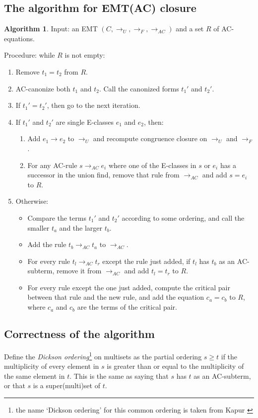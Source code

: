 \documentclass[12pt,a4paper,twoside,openright]{report}
\numberwithin{equation}{chapter}		%
\numberwithin{figure}{chapter}			%
\numberwithin{table}{chapter}			%
\theoremstyle{definition}
\newtheorem{algorithm}{Algorithm}
\theoremstyle{plain}
\begin{document}
\subsection{The algorithm for EMT(AC) closure}
\begin{algorithm} \label{acclosure}
	Input: an EMT $(C, \rightarrow_U, \rightarrow_F, \rightarrow_{AC})$ and a set $R$ of AC-equations.
	
	Procedure: while $R$ is not empty:
		\begin{enumerate}
			\item Remove $t_1 = t_2$ from $R$.
			\item AC-canonize both $t_1$ and $t_2$. Call the canonized forms $t_1'$ and $t_2'$.
			\item If $t_1' = t_2'$, then go to the next iteration.
			\item If $t_1'$ and $t_2'$ are single E-classes $e_1$ and $e_2$, then:
					\begin{enumerate}
						\item Add $e_1 \rightarrow e_2$ to $\rightarrow_U$ and recompute congruence closure on $\rightarrow_U$ and $\rightarrow_F$.
						\item For any AC-rule $s \rightarrow_{AC} e_i$ where one of the E-classes in $s$ or $e_i$ has a successor in the union find, remove that rule from $\rightarrow_{AC}$ and add $s = e_i$ to $R$.
					\end{enumerate}
			\item Otherwise:
				\begin{itemize}
					\item Compare the terms $t_1'$ and $t_2'$ according to some ordering, and call the smaller $t_a$ and the larger $t_b$.
					\item Add the rule $t_b \rightarrow_{AC} t_a$ to $\rightarrow_{AC}$.
					\item For every rule $t_l \rightarrow_{AC} t_r$ except the rule just added, if $t_l$ has $t_b$ as an AC-subterm, remove it from $\rightarrow_{AC}$ and add $t_l = t_r$ to $R$.
					\item For every rule except the one just added, compute the critical pair between that rule and the new rule, and add the equation $c_a = c_b$ to $R$, where $c_a$ and $c_b$ are the terms of the critical pair.
				\end{itemize}
		\end{enumerate}
\end{algorithm}

\subsection{Correctness of the algorithm} \label{equivres}
Define the \emph{Dickson ordering}\footnote{the name `Dickson ordering' for this common ordering is taken from Kapur \cite{kapur_modular_2021, kapur_modularity_2023}} on multisets as the partial ordering $s \ge t$ if the multiplicity of every element in $s$ is greater than or equal to the multiplicity of the same element in $t$. This is the same as saying that $s$ has $t$ as an AC-subterm, or that $s$ is a super(multi)set of $t$.
\end{document}
